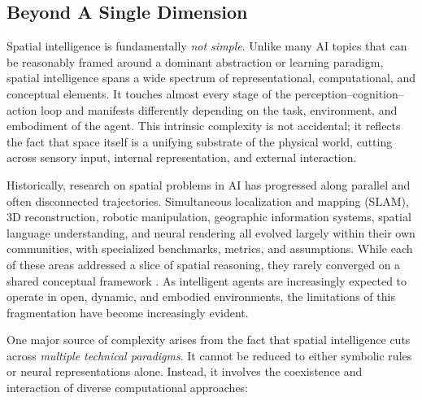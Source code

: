\subsection{Beyond A Single Dimension}
\label{subsec:p1-sec2-beyond-a-single-dimension}

Spatial intelligence is fundamentally \emph{not simple}.
Unlike many AI topics that can be reasonably framed around a dominant abstraction or learning paradigm, spatial intelligence spans a wide spectrum of representational, computational, and conceptual elements.
It touches almost every stage of the perception–cognition–action loop and manifests differently depending on the task, environment, and embodiment of the agent.
This intrinsic complexity is not accidental; it reflects the fact that space itself is a unifying substrate of the physical world, cutting across sensory input, internal representation, and external interaction.


Historically, research on spatial problems in AI has progressed along parallel and often disconnected trajectories.
Simultaneous localization and mapping (SLAM), 3D reconstruction, robotic manipulation, geographic information systems, spatial language understanding, and neural rendering all evolved largely within their own communities, with specialized benchmarks, metrics, and assumptions.
While each of these areas addressed a slice of spatial reasoning, they rarely converged on a shared conceptual framework \cite{feng2025survey}.
As intelligent agents are increasingly expected to operate in open, dynamic, and embodied environments, the limitations of this fragmentation have become increasingly evident.


One major source of complexity arises from the fact that spatial intelligence cuts across \emph{multiple technical paradigms}.
It cannot be reduced to either symbolic rules or neural representations alone.
Instead, it involves the coexistence and interaction of diverse computational approaches:


